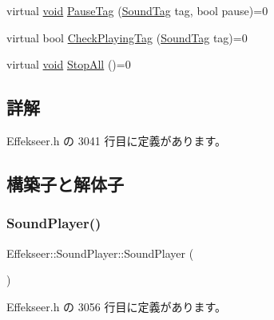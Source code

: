 \begin{DoxyCompactItemize}
\item 
virtual \mbox{\hyperlink{namespace_effekseer_ab34c4088e512200cf4c2716f168deb56}{void}} \mbox{\hyperlink{class_effekseer_1_1_sound_player_a331ad801eed06611fffc50354837b70e}{Pause\+Tag}} (\mbox{\hyperlink{namespace_effekseer_adb219197297396cf2ab9bee657551a29}{Sound\+Tag}} tag, bool pause)=0
\item 
virtual bool \mbox{\hyperlink{class_effekseer_1_1_sound_player_a12a4c022f15f7a8a9d3e3235a351606c}{Check\+Playing\+Tag}} (\mbox{\hyperlink{namespace_effekseer_adb219197297396cf2ab9bee657551a29}{Sound\+Tag}} tag)=0
\item 
virtual \mbox{\hyperlink{namespace_effekseer_ab34c4088e512200cf4c2716f168deb56}{void}} \mbox{\hyperlink{class_effekseer_1_1_sound_player_a058465ab0f8c94607651a743767f64d2}{Stop\+All}} ()=0
\end{DoxyCompactItemize}


\subsection{詳解}


 Effekseer.\+h の 3041 行目に定義があります。



\subsection{構築子と解体子}
\mbox{\label{class_effekseer_1_1_sound_player_a64593615152ced591b2b347fc7555d69}} 
\subsubsection{\texorpdfstring{Sound\+Player()}{SoundPlayer()}}
{\footnotesize\ttfamily Effekseer\+::\+Sound\+Player\+::\+Sound\+Player (\begin{DoxyParamCaption}{ }\end{DoxyParamCaption})\hspace{0.3cm}{\ttfamily [inline]}}



 Effekseer.\+h の 3056 行目に定義があります。

\mbox{\label{class_effekseer_1_1_sound_player_a93693b494f59c66a1a5e6a830fa4b62f}} 
